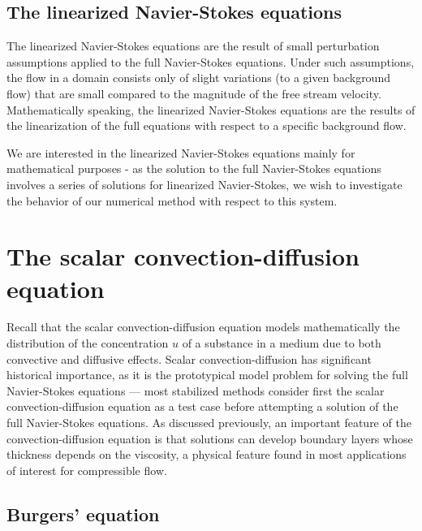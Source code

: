\subsection{The linearized Navier-Stokes equations}

The linearized Navier-Stokes equations are the result of small perturbation assumptions applied to the full Navier-Stokes equations. Under such assumptions, the flow in a domain consists only of slight variations (to a given background flow) that are small compared to the magnitude of the free stream velocity.  Mathematically speaking, the linearized Navier-Stokes equations are the results of the linearization of the full equations with respect to a specific background flow.  %

We are interested in the linearized Navier-Stokes equations mainly for mathematical purposes - as the solution to the full Navier-Stokes equations involves a series of solutions for linearized Navier-Stokes, we wish to investigate the behavior of our numerical method with respect to this system.  

\section{The scalar convection-diffusion equation}

Recall that the scalar convection-diffusion equation models mathematically the distribution of the concentration $u$ of a substance in a medium due to both convective and diffusive effects. 
Scalar convection-diffusion has significant historical importance, as it is the prototypical model problem for solving the full Navier-Stokes equations --- most stabilized methods consider first the scalar convection-diffusion equation as a test case before attempting a solution of the full Navier-Stokes equations. As discussed previously, an important feature of the convection-diffusion equation is that solutions can develop boundary layers whose thickness depends on the viscosity, a physical feature found in most applications of interest for compressible flow. 

\subsection{Burgers' equation}


